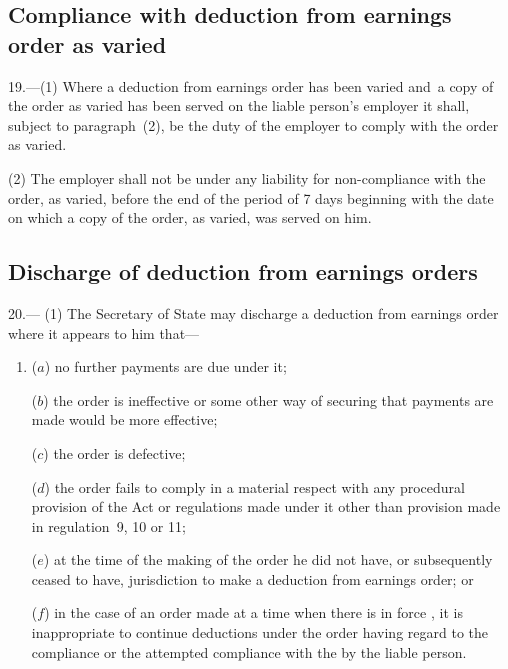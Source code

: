\documentclass[12pt,a4paper]{article}
\begin{document}
\subsection[19. Compliance with deduction from earnings order as varied]{Compliance with deduction from earnings order as varied}

19.—(1) Where a deduction from earnings order has been varied and~a copy of the order as varied has been served on the liable person’s employer it shall, subject to paragraph~(2), be the duty of the employer to comply with the order as varied.

(2) The employer shall not be under any liability for non-compliance with the order, as varied, before the end of the period of 7 days beginning with the date on which a copy of the order, as varied, was served on him.

\subsection[20. Discharge of deduction from earnings orders]{Discharge of deduction from earnings orders}

20.—%
%
%
(1) The Secretary of State may discharge a deduction from earnings order where it appears to him that—
\begin{enumerate}\item[]
($a$) no further payments are due under it;

($b$) the order is ineffective or some other way of securing that payments are made would be more effective;

($c$) the order is defective;

($d$) the order fails to comply in a material respect with any procedural provision of the Act or regulations made under it other than provision made in regulation~9, 10 or 11;

($e$) at the time of the making of the order he did not have, or subsequently ceased to have, jurisdiction to make a deduction from earnings order; or

($f$) in the case of an order made at a time when there is in force 
,  %
it is inappropriate to continue deductions under the order having regard to the compliance or the attempted compliance with the 
by the liable person.
\end{enumerate}
\end{document}
